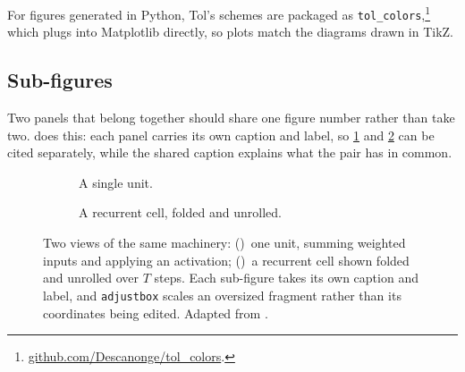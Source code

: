 For figures generated in Python, Tol's schemes are packaged as
\texttt{tol\_colors},\footnote{\href{https://github.com/Descanonge/tol_colors}{github.com/Descanonge/tol\_colors}.}
which plugs into Matplotlib directly, so plots match the diagrams drawn in
TikZ.

\subsection{Sub-figures}
\label{sec:subfigures}


Two panels that belong together should share one figure number rather than
take two.  does this: each panel carries its own
caption and label, so \cref{fig:neuron} and \cref{fig:rnn} can be cited
separately, while the shared caption explains what the pair has in common.

\begin{figure}
\centering
\begin{subfigure}[b]{0.44\textwidth}
  \centering
  \begin{minipage}[c][45mm][c]{\linewidth}
    \centering
  \end{minipage}
  \caption{A single unit.}
  \label{fig:neuron}
\end{subfigure}
\hfill
\begin{subfigure}[b]{0.52\textwidth}
  \centering
  \begin{minipage}[c][45mm][c]{\linewidth}
    \centering
  \end{minipage}
  \caption{A recurrent cell, folded and unrolled.}
  \label{fig:rnn}
\end{subfigure}
\caption[A single unit and a recurrent cell]{Two views of the same machinery:
()~one unit,
summing weighted inputs and applying an activation; ()~a
recurrent cell shown folded and unrolled over $T$ steps. Each sub-figure takes
its own caption and label, and \texttt{adjustbox} scales an oversized fragment
rather than its coordinates being edited. Adapted from
\textcite{love2024nntikz}.}
\label{fig:network_pair}
\end{figure}
